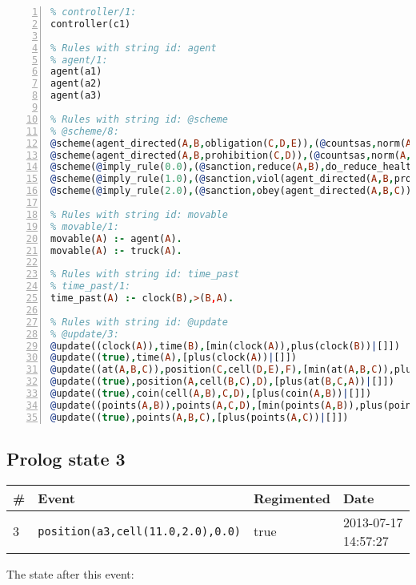 \documentclass[11pt]{article}\usepackage[utf8]{inputenc}\usepackage{geometry}
\begin{document}
\begin{lstlisting}[language=Prolog, numbers=left]
% Rules with string id: controller
% controller/1:
controller(c1)

% Rules with string id: agent
% agent/1:
agent(a1)
agent(a2)
agent(a3)

% Rules with string id: @scheme
% @scheme/8:
@scheme(agent_directed(A,B,obligation(C,D,E)),(@countsas,norm(A,B,F,obligation(C,D,E)),F),false,(listTrue(C)),(time_past(D)),false,[plus(viol(agent_directed(A,B,obligation(C,D,E))))|[]],[plus(obey(agent_directed(A,B,obligation(C,D,E))))|[]])
@scheme(agent_directed(A,B,prohibition(C,D)),(@countsas,norm(A,B,E,prohibition(C,D)),E),(listTrue(C)),false,(false),false,[plus(viol(agent_directed(A,B,prohibition(C,D))))|[]],[plus(obey(agent_directed(A,B,prohibition(C,D))))|[]])
@scheme(@imply_rule(0.0),(@sanction,reduce(A,B),do_reduce_health(A,B),notifyAgent(A,changed(status))),true,false,false,false,[min(reduce(A,B))|[]],[])
@scheme(@imply_rule(1.0),(@sanction,viol(agent_directed(A,B,prohibition(C,D))),do_sanction(D)),true,false,false,false,[min(viol(agent_directed(A,B,prohibition(C,D))))|[]],[])
@scheme(@imply_rule(2.0),(@sanction,obey(agent_directed(A,B,C))),true,false,false,false,[min(obey(agent_directed(A,B,C)))|[]],[])

% Rules with string id: movable
% movable/1:
movable(A) :- agent(A).
movable(A) :- truck(A).

% Rules with string id: time_past
% time_past/1:
time_past(A) :- clock(B),>(B,A).

% Rules with string id: @update
% @update/3:
@update((clock(A)),time(B),[min(clock(A)),plus(clock(B))|[]])
@update((true),time(A),[plus(clock(A))|[]])
@update((at(A,B,C)),position(C,cell(D,E),F),[min(at(A,B,C)),plus(at(D,E,C))|[]])
@update((true),position(A,cell(B,C),D),[plus(at(B,C,A))|[]])
@update((true),coin(cell(A,B),C,D),[plus(coin(A,B))|[]])
@update((points(A,B)),points(A,C,D),[min(points(A,B)),plus(points(A,D))|[]])
@update((true),points(A,B,C),[plus(points(A,C))|[]])

\end{lstlisting}
\clearpage 
\subsection{Prolog state 3}
\begin{table}[ht]
\centering 
\begin{tabular}{l l l l} 
\textbf{\#} & \textbf{Event} & \textbf{Regimented} & \textbf{Date} \\ [0.5ex] 
\hline
3&\texttt{position(a3,cell(11.0,2.0),0.0)}&true&2013-07-17 14:57:27\\ [1ex] \hline\end{tabular}
\end{table}
The state after this event:
\end{document}
